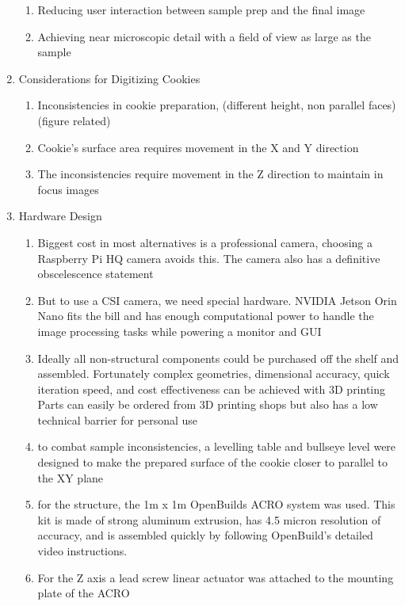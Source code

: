 \documentclass{article}
\begin{document}
\begin{outline}[enumerate]
\begin{enumerate}
\begin{enumerate}
				\item Reducing user interaction between sample prep and the final image
				\item Achieving near microscopic detail with a field of view as large as the sample
			\end{enumerate}
		\item Considerations for Digitizing Cookies
		\begin{enumerate}
			\item Inconsistencies in cookie preparation, (different height, non parallel faces) (figure related) %
			\item Cookie's surface area requires movement in the X and Y direction
			\item The inconsistencies require movement in the Z direction to maintain in focus images
		\end{enumerate}
		\item Hardware Design
			\begin{enumerate}
				\item Biggest cost in most alternatives is a professional camera, choosing a Raspberry Pi HQ camera avoids this. The camera also has a definitive obscelescence statement %
				\item But to use a CSI camera, we need special hardware. NVIDIA Jetson Orin Nano fits the bill and has enough computational power to handle the image processing tasks while powering a monitor and GUI %
				\item Ideally all non-structural components could be purchased off the shelf and assembled. Fortunately complex geometries, dimensional accuracy, quick iteration speed, and cost effectiveness can be achieved with 3D printing  %
					\subitem Parts can easily be ordered from 3D printing shops but also has a low technical barrier for personal use
				\item to combat sample inconsistencies, a levelling table and bullseye level were designed to make the prepared surface of the cookie closer to parallel to the XY plane
				\item for the structure, the 1m x 1m OpenBuilds ACRO system was used. This kit is made of strong aluminum extrusion, has 4.5 micron resolution of accuracy, and is assembled quickly by following OpenBuild's detailed video instructions. %
				\item For the Z axis a lead screw linear actuator was attached to the mounting plate of the ACRO
			\end{enumerate}

\end{enumerate}
\end{outline}
\end{document}
